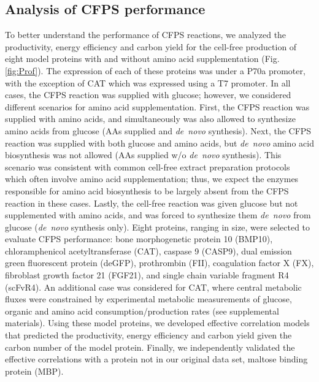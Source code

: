 \documentclass[journal=asbcd6,manuscript=article]{achemso}
\begin{document}
\subsection{Analysis of CFPS performance}
To better understand the performance of CFPS reactions, we analyzed the productivity, energy efficiency and carbon yield for the cell-free production of eight model proteins with and without amino acid supplementation (Fig. \ref{fig:Prof}).
The expression of each of these proteins was under a P70a promoter, with the exception of CAT which was expressed using a T7 promoter.
In all cases, the CFPS reaction was supplied with glucose; however, we considered different scenarios for amino acid supplementation.
First, the CFPS reaction was supplied with amino acids, and simultaneously was also allowed to synthesize amino acids from glucose (AAs supplied and \textit{de~novo} synthesis).
Next, the CFPS reaction was supplied with both glucose and amino acids, but \textit{de~novo} amino acid biosynthesis was not allowed (AAs supplied w/o \textit{de~novo} synthesis).
This scenario was consistent with common cell-free extract preparation protocols which often involve amino acid supplementation;
thus, we expect the enzymes responsible for amino acid biosynthesis to be largely absent from the CFPS reaction in these cases.
Lastly, the cell-free reaction was given glucose but not supplemented with amino acids, and was forced to synthesize them \textit{de~novo} from glucose (\textit{de~novo} synthesis only).
Eight proteins, ranging in size, were selected to evaluate CFPS performance: bone morphogenetic protein 10 (BMP10),
chloramphenicol acetyltransferase (CAT), caspase 9 (CASP9), dual emission green fluorescent protein (deGFP),
prothrombin (FII), coagulation factor X (FX), fibroblast growth factor 21 (FGF21), and single chain variable fragment R4 (scFvR4).
An additional case was considered for CAT, where central metabolic fluxes were constrained by experimental metabolic measurements of glucose, organic and amino acid consumption/production rates (see supplemental materials).
Using these model proteins, we developed effective correlation models that predicted the productivity, energy efficiency and carbon yield given the carbon number of the model protein.
Finally, we independently validated the effective correlations with a protein not in our original data set, maltose binding protein (MBP).


\end{document}
